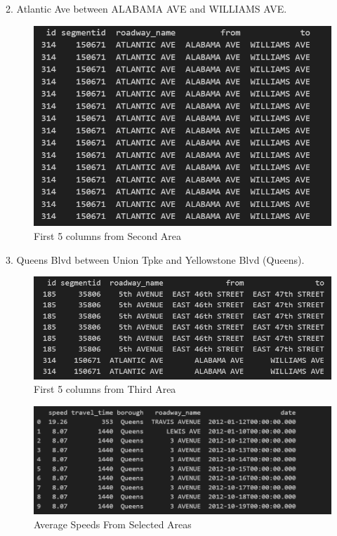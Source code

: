 2. Atlantic Ave between ALABAMA AVE and WILLIAMS AVE.\\
\begin{figure}[H]
    \centering
    \includegraphics[width=\textwidth]{figures/area-2.PNG}
    \caption{First 5 columns from Second Area}
    \label{fig:Data From Selected Area}
\end{figure}
3. Queens Blvd between Union Tpke and Yellowstone Blvd (Queens).\\
\begin{figure}[H]
    \centering
    \includegraphics[width=\textwidth]{figures/area-3.PNG}
    \caption{First 5 columns from Third Area}
    \label{fig:Data From Selected Area}
\end{figure}
\begin{figure}[h]
    \centering
    \includegraphics[width=1\linewidth]{figures/data_from_selected_area.PNG}
    \caption{Average Speeds From Selected Areas}
    \label{fig:Data From Selected Area}
\end{figure}
